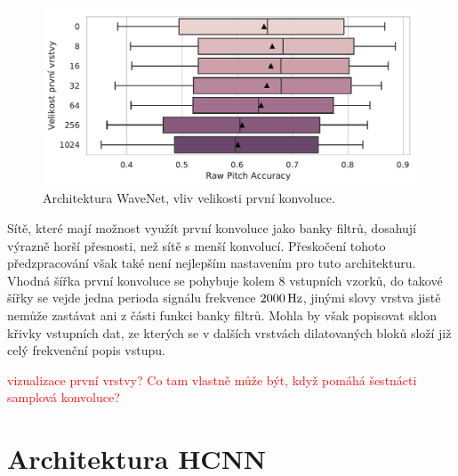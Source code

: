 \begin{figure}[h]\centering
    \includegraphics[scale=0.6]{../img/figures/wavenet_first_layer}
\caption{Architektura WaveNet, vliv velikosti první konvoluce.}\label{obr:wavenet_first_layer}
\end{figure}

Sítě, které mají možnost využít první konvoluce jako banky filtrů, dosahují výrazně horší přesnosti, než sítě s menší konvolucí. Přeskočení tohoto předzpracování však také není nejlepším nastavením pro tuto architekturu. Vhodná šířka první konvoluce se pohybuje kolem 8 vstupních vzorků, do takové šířky se vejde jedna perioda signálu frekvence $2000\,\rm Hz$, jinými slovy vrstva jistě nemůže zastávat ani z části funkci banky filtrů. Mohla by však popisovat sklon křivky vstupních dat, ze kterých se v dalších vrstvách dilatovaných bloků složí již celý frekvenční popis vstupu.

\textcolor{red}{vizualizace první vrstvy? Co tam vlastně může být, když pomáhá šestnácti samplová konvoluce?}




\section{Architektura HCNN}

